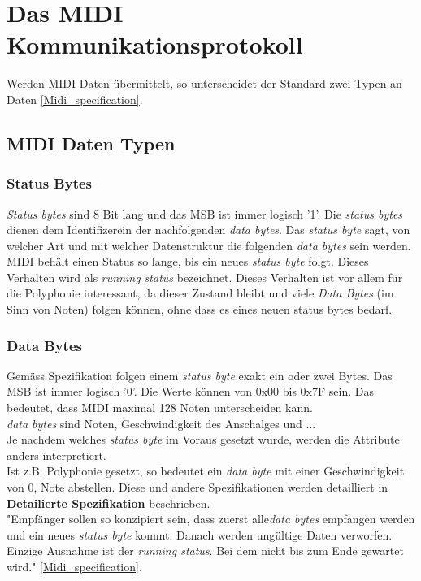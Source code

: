 \newpage
\section{Das MIDI Kommunikationsprotokoll}\label{sect.midi_spezification}
Werden MIDI Daten übermittelt, so unterscheidet der Standard zwei Typen an Daten \ref{Midi_specification}.

\subsection{MIDI Daten Typen}\label{datenytpen}
\subsubsection*{Status Bytes}
\textit{Status bytes} sind 8 Bit lang und das MSB ist immer logisch '1'. Die \textit{status bytes} dienen dem Identifizerein der nachfolgenden \textit{data bytes}. Das \textit{status byte} sagt, von welcher Art und mit welcher Datenstruktur die folgenden \textit{data bytes} sein werden.\\
MIDI behält einen Status so lange, bis ein neues \textit{status byte} folgt. Dieses Verhalten wird als \textit{running status} bezeichnet. Dieses Verhalten ist vor allem für die Polyphonie interessant, da dieser Zustand bleibt und viele \textit{Data Bytes} (im Sinn von Noten) folgen können, ohne dass es eines neuen status bytes bedarf.\\

\subsubsection*{Data Bytes}
Gemäss Spezifikation folgen einem \textit{status byte} exakt ein oder zwei Bytes. Das MSB ist immer logisch '0'. Die Werte können von 0x00 bis 0x7F sein. Das bedeutet, dass MIDI maximal 128 Noten unterscheiden kann.\\
\textit{data bytes} sind Noten, Geschwindigkeit des Anschalges und ...\\
Je nachdem welches \textit{status byte} im Voraus gesetzt wurde, werden die Attribute anders interpretiert.\\
Ist z.B. Polyphonie gesetzt, so bedeutet ein \textit{data byte} mit einer Geschwindigkeit von 0, Note abstellen. Diese und andere Spezifikationen werden detailliert in \textbf{Detailierte Spezifikation} beschrieben.
\\
"Empfänger sollen so konzipiert sein, dass zuerst alle\textit{data bytes} empfangen werden und ein neues \textit{status byte} kommt. Danach werden ungültige Daten verworfen. Einzige Ausnahme ist der \textit{running status}. Bei dem nicht bis zum Ende gewartet wird." \ref{Midi_specification}.\\

